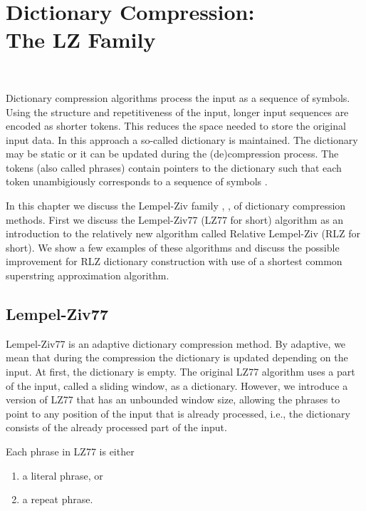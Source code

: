 \documentclass[english,twoside,censored,csm,algorithms-track-2020]{HYthesisML}
\theoremstyle{plain}
\theoremstyle{definition}
\numberwithin{testexample}{chapter}
\begin{document}
\chapter[Dictionary Compression: The LZ Family]{\texorpdfstring{Dictionary Compression: \\ The LZ Family}{Dictionary Compression: The LZ Family}}~\label{chp-rlz}

Dictionary compression algorithms \citep{Storer82} process the input as a sequence of symbols.
Using the structure and repetitiveness of the input, longer input sequences are encoded as shorter
tokens. This reduces the space needed to store the original input data. In this approach a so-called
dictionary is maintained. The dictionary may be static or it can be updated during the (de)compression process.
The tokens (also called phrases) contain pointers to the dictionary such that each token
unambigiously corresponds to a sequence of symbols \citep{Pu05}.

In this chapter we discuss the Lempel-Ziv family \citep{Ziv77}, \citep{Ziv78}, \citep{Welch84}
 of dictionary compression methods.
First we discuss the Lempel-Ziv77 (LZ77 for short) algorithm
\citep{Ziv77} as an introduction to the relatively new  algorithm called
Relative Lempel-Ziv \citep{Kurppu10} (RLZ for short). We show a few examples of these algorithms and
discuss the possible improvement for RLZ dictionary construction with use of a shortest common
superstring approximation algorithm.

\section{Lempel-Ziv77}

Lempel-Ziv77 is an adaptive dictionary compression method. By adaptive, we mean that during the
compression the dictionary is updated depending on the input. At first, the dictionary is empty. 
The original LZ77 algorithm uses a part of the input, called a sliding window, as a dictionary.
However, we introduce a version of LZ77 that has an unbounded window size, allowing the phrases
to point to any position of the input that is already processed, i.e., the dictionary consists of the
already processed part of the input.

Each phrase in LZ77 is either 
\begin{enumerate}
\item a literal phrase, or
\item a repeat phrase.
\end{enumerate}
\end{document}

